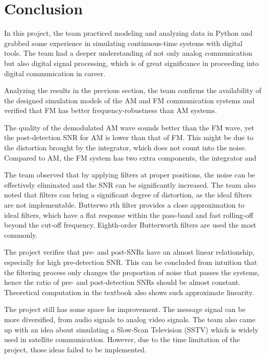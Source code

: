 \documentclass[../ECE459FinalProjectReport.tex]{subfiles}
\begin{document}
\chapter{Conclusion}

In this project, the team practiced modeling and analyzing data in Python and grabbed some experience in simulating continuous-time systems with digital tools. The team had a deeper understanding of not only analog communication but also digital signal processing, which is of great significance in proceeding into digital communication in career.

Analyzing the results in the previous section, the team confirms the availability of the designed simulation models of the AM and FM communication systems and verified that FM has better frequency-robustness than AM systems.

The quality of the demodulated AM wave sounds better than the FM wave, yet the post-detection SNR for AM is lower than that of FM. This might be due to the distortion brought by the integrator, which does not count into the noise. Compared to AM, the FM system has two extra components, the integrator and 

The team observed that by applying filters at proper positions, the noise can be effectively eliminated and the SNR can be significantly increased. The team also noted that filters can bring a significant degree of distortion, as the ideal filters are not implementable. Butterwo rth filter provides a close approximation to ideal filters, which have a flat response within the pass-band and fast rolling-off beyond the cut-off frequency. Eighth-order Butterworth filters are used the most commonly.

The project verifies that pre- and post-SNRs have an almost linear relationship, especially for high pre-detection SNR. This can be concluded from intuition that the filtering process only changes the proportion of noise that passes the systems, hence the ratio of pre- and post-detection SNRs should be almost constant. Theoretical computation in the textbook \cite[Sec. 9.6 \& 9.7]{haykinIntroductionAnalogDigital2007}
also shows such approximate linearity.

The project still has some space for improvement. The message signal can be more diversified, from audio signals to analog video signals. The team also came up with an idea about simulating a Slow-Scan Television (SSTV) which is widely used in satellite communication. However, due to the time limitation of the project, those ideas failed to be implemented.
\end{document}
